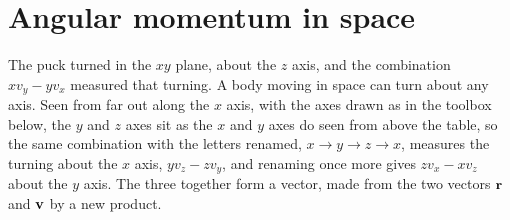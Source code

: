 \section{Angular momentum in space}
\label{sec:ro-cross}

The puck turned in the $xy$ plane, about the $z$ axis, and the combination
$xv_y - yv_x$ measured that turning. A body moving in space can turn about
any axis. Seen from far out along the $x$ axis, with the axes drawn as in
the toolbox below, the $y$ and $z$ axes sit as the $x$ and $y$ axes do
seen from above the table, so the same combination with the letters
renamed, $x \to y \to z \to x$, measures the turning about the $x$ axis,
$yv_z - zv_y$, and renaming once more gives $zv_x - xv_z$ about the $y$
axis. The three together form a vector, made from the two vectors $\bm{\mathrm{r}}$
and $\bm{\mathrm{v}}$ by a new product.

